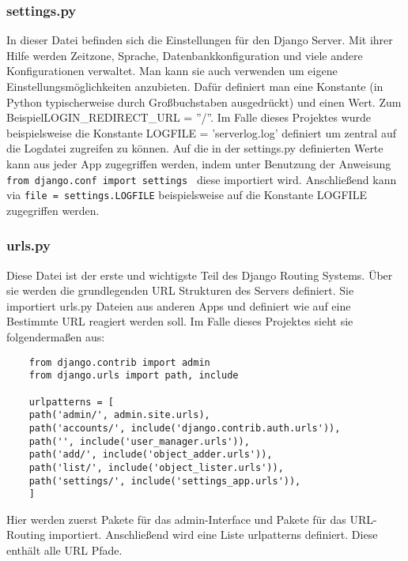 \documentclass{article}
\begin{document}
\subsubsection{settings.py}
In dieser Datei befinden sich die Einstellungen für den Django Server. Mit ihrer Hilfe werden Zeitzone, Sprache, Datenbankkonfiguration und viele andere Konfigurationen verwaltet. Man kann sie auch verwenden um eigene Einstellungsmöglichkeiten anzubieten. Dafür definiert man eine Konstante (in Python typischerweise durch Großbuchstaben ausgedrückt) und einen Wert. Zum Beispiel\newline LOGIN\_REDIRECT\_URL = ''/''. Im Falle dieses Projektes wurde beispielsweise die Konstante LOGFILE = 'serverlog.log' definiert um zentral auf die Logdatei zugreifen zu können. Auf die in der settings.py definierten Werte kann aus jeder App zugegriffen werden, indem unter Benutzung der Anweisung\newline
 \texttt{from django.conf import settings }  diese importiert wird. Anschließend kann via \texttt{file = settings.LOGFILE} beispielsweise auf die Konstante LOGFILE zugegriffen werden.
 
\subsubsection{urls.py}
Diese Datei ist der erste und wichtigste Teil des Django Routing Systems. Über sie werden die grundlegenden URL Strukturen des Servers definiert. Sie importiert urls.py Dateien aus anderen Apps und definiert wie auf eine Bestimmte URL reagiert werden soll. Im Falle dieses Projektes sieht sie folgendermaßen aus:

\begin{verbatim}
	from django.contrib import admin
	from django.urls import path, include
	
	urlpatterns = [
	path('admin/', admin.site.urls),
	path('accounts/', include('django.contrib.auth.urls')),
	path('', include('user_manager.urls')),
	path('add/', include('object_adder.urls')),
	path('list/', include('object_lister.urls')),
	path('settings/', include('settings_app.urls')),
	]
\end{verbatim}
Hier werden zuerst Pakete für das admin-Interface und Pakete für das URL-Routing importiert. Anschließend wird eine Liste urlpatterns definiert. Diese enthält alle URL Pfade.
\end{document}
